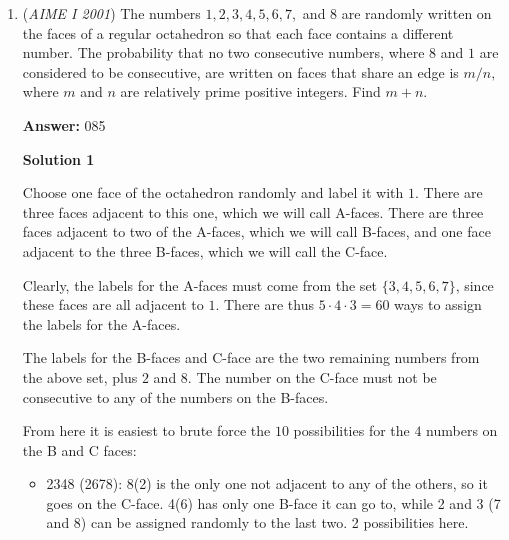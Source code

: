 \begin{enumerate}
When we see this problem, we immediately think of recursion. Let $a_k$ be the point such that the rightmost house of k houses receives mail. Then $a_1=1$, $a_2=1$, $a_3=2$. Now, we find the recurrence relation 
 \[a_n=a_{n-3}+a_{n-2}\] because  we can either have 1 space in between the mailed rightmost house of $a_n$, or two spaces, as in our previous a’s we already have the a\_n mailed rightmost. Solving, we get $a_{17}=86, a_{18}=114, a_{19}=151$. Now, we realize that the number of ways for the 19 houses to get mail is the sum of $a_{17},a_{18},a_{19}$ because we can either have 2 empty no mail houses, 1 house, or the rightmost house is lit. Summing, we get $\boxed{351}$. 

 


	\item (\textit{AIME I 2001}) The numbers $1, 2, 3, 4, 5, 6, 7,$ and $8$ are randomly written on the faces of a regular octahedron so that each face contains a different number.  The probability that no two consecutive numbers, where $8$ and $1$ are considered to be consecutive, are written on faces that share an edge is $m/n,$ where $m$ and $n$ are relatively prime positive integers.  Find $m + n.$

 \textbf{Answer: }085



\textbf{Solution 1}

Choose one face of the octahedron randomly and label it with $1$.  There are three faces adjacent to this one, which we will call A-faces.  There are three faces adjacent to two of the A-faces, which we will call B-faces, and one face adjacent to the three B-faces, which we will call the C-face.

 Clearly, the labels for the A-faces must come from the set $\{3,4,5,6,7\}$, since these faces are all adjacent to $1$.  There are thus $5 \cdot 4 \cdot 3 = 60$ ways to assign the labels for the A-faces.  

 The labels for the B-faces and C-face are the two remaining numbers from the above set, plus $2$ and $8$.  The number on the C-face must not be consecutive to any of the numbers on the B-faces.  

 From here it is easiest to brute force the $10$ possibilities for the $4$ numbers on the B and C faces:

 
            \begin{itemize}
        \item 2348 (2678): 8(2) is the only one not adjacent to any of the others, so it goes on the C-face.  4(6) has only one B-face it can go to, while 2 and 3 (7 and 8) can be assigned randomly to the last two.  2 possibilities here.
            \end{itemize}
            

\end{enumerate}
